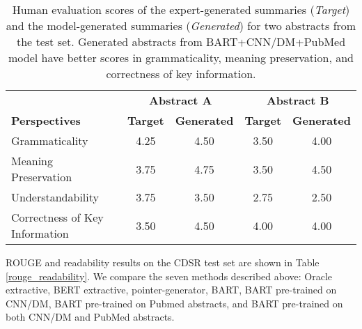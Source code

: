 \documentclass[letterpaper, table]{article} %
\begin{document}


\begin{table*}
\centering
\begin{tabular}{@{} l cc cc @{}}
\toprule
                  & \multicolumn{2}{c}{\textbf{Abstract A}} & \multicolumn{2}{c}{\textbf{Abstract B}} \\
\cmidrule(lr){2-3}
\cmidrule(lr){4-5}
\textbf{Perspectives} & \textbf{Target}  & \textbf{Generated} & \textbf{Target}  & \textbf{Generated} \\
\midrule
Grammaticality            & 4.25    & 4.50        &3.50     & 4.00 \\
Meaning Preservation       & 3.75    & 4.75       & 3.50     & 4.50 \\
Understandability  & 3.75    & 3.50        & 2.75    & 2.50     \\
Correctness of Key Information        & 3.50     & 4.50    & 4.00       & 4.00 \\
\bottomrule
\end{tabular}
\caption{Human evaluation scores of the expert-generated summaries (\textit{Target}) and the model-generated summaries (\textit{Generated}) for two abstracts from the test set. Generated abstracts from BART+CNN/DM+PubMed model have better scores in grammaticality, meaning preservation, and correctness of key information.}
\label{result_human_evaluation}

\end{table*}
ROUGE and readability results on the CDSR test set are shown in Table \ref{rouge_readability}. We compare the seven methods described above: Oracle extractive, BERT extractive, pointer-generator, BART, BART pre-trained on CNN/DM, BART pre-trained on Pubmed abstracts, and BART pre-trained on both CNN/DM and PubMed abstracts. 
\end{document}
